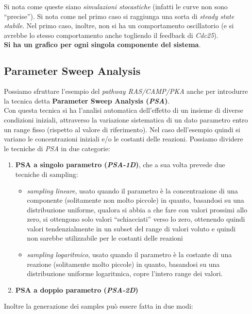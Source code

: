 \documentclass[a4paper,12pt, oneside]{book}
\begin{document}
Si nota come queste siano \textit{simulazioni stocastiche} (infatti le curve
non sono ``precise''). Si nota come nel primo caso si raggiunga una sorta di
\textit{steady state stabile}. Nel primo caso, inoltre, non si ha un
comportamento oscillatorio (e si avrebbe lo stesso comportamento anche togliendo
il feedback di \textit{Cdc25}).\\
\textbf{Si ha un grafico per ogni singola componente del sistema}.
\subsection{Parameter Sweep Analysis}
Possiamo sfruttare l'esempio del \textit{pathway RAS/CAMP/PKA} anche per
introdurre la tecnica detta \textbf{Parameter Sweep Analysis (\textit{PSA})}.\\
Con questa tecnica si ha l'analisi automatica dell'effetto di un insieme di
diverse condizioni iniziali, attraverso la variazione sistematica di un dato
parametro entro un range fisso (rispetto al valore di riferimento). Nel caso
dell'esempio quindi si variano le concentrazioni iniziali e/o le costanti delle
reazioni. Possiamo dividere le tecniche di \textit{PSA} in due categorie:
\begin{enumerate}
  \item \textbf{PSA a singolo parametro (\textit{PSA-1D})}, che a sua volta
  prevede due tecniche di sampling:
  \begin{itemize}
    \item \textit{sampling lineare}, usato quando il parametro è la
    concentrazione di una componente (solitamente non molto piccole) in quanto,
    basandosi su una distribuzione 
    uniforme, qualora si abbia a che fare con valori prossimi allo zero, si
    ottengono solo valori ``schiacciati'' verso lo zero, ottenendo quindi valori
    tendenzialmente in un subset del range di valori voluto e quindi non sarebbe
    utilizzabile per le costanti delle reazioni
     \item \textit{sampling logaritmico}, usato quando il parametro è la
    costante di una reazione (solitamente molto piccole) in quanto, basandosi su
    una distribuzione 
    uniforme logaritmica, copre l'intero range dei valori. 
  \end{itemize}
  \item \textbf{PSA a doppio parametro (\textit{PSA-2D})}
\end{enumerate}
Inoltre la generazione dei samples può essere fatta in due modi:
\end{document}
